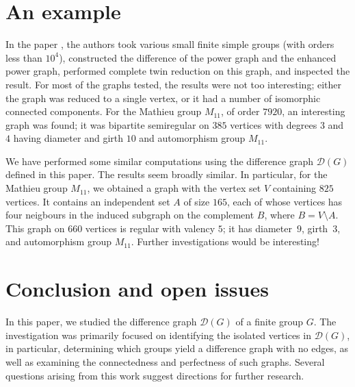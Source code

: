 \documentclass[12pt]{amsart}
\theoremstyle{plain}
\theoremstyle{remark}
\theoremstyle{definition}
\begin{document}
\section{An example}
\label{sec:example}

In the paper \cite{bcdd}, the authors took various small finite simple groups
(with orders less than $10^4$), constructed the difference of the power graph
and the enhanced power graph, performed complete twin reduction on this graph,
and inspected the result. For most of the graphs tested, the results were not
too interesting; either the graph was reduced to a single vertex, or it had
a number of isomorphic connected components. For the Mathieu group $M_{11}$,
of order $7920$, an interesting graph was found; it was bipartite semiregular
on $385$ vertices with degrees $3$ and $4$ having diameter and girth $10$ and
automorphism group $M_{11}$.

We have performed some similar computations using the difference graph
$\mathcal{D}(G)$ defined in this paper. The results seem broadly similar.
In particular, for the Mathieu group $M_{11}$, we obtained a graph with the vertex set $V$ containing
$825$ vertices. It contains an independent set $A$ of size $165$, each of whose
vertices has four neigbours in the induced subgraph on the complement $B$, where $B=V\setminus A$.
This graph on $660$ vertices is regular with valency $5$; it has diameter~$9$,
girth~$3$, and automorphism group $M_{11}$. 
Further investigations would be interesting!

%
%

\section{Conclusion and open issues}
\label{sec:Conclusion-open-prob}

In this paper, we studied the difference graph $\mathcal{D}(G)$ of a finite group $G$. 
The investigation was primarily focused on identifying the isolated vertices in $\mathcal{D}(G)$, 
in particular, determining which groups yield a difference graph with no edges, 
as well as examining the connectedness and perfectness of such graphs. 
Several questions arising from this work suggest directions for further research.
\end{document}
